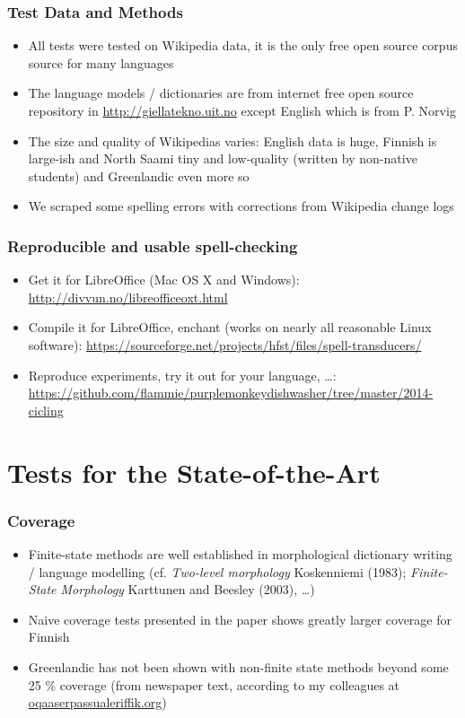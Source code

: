 \documentclass[t,12pt]{beamer}
\begin{document}
\begin{frame}
    \frametitle{Test Data and Methods}
    \begin{itemize}
        \item All tests were tested on Wikipedia data, it is the only free
            open source corpus source for many languages
        \item The language models / dictionaries are from internet free open
            source repository in \url{http://giellatekno.uit.no} except English
            which is from P. Norvig
        \item The size and quality of Wikipedias varies: English data is
            huge, Finnish is large-ish and North Saami tiny and low-quality
            (written by non-native students) and Greenlandic even more so

        \item We scraped some spelling errors with corrections from
            Wikipedia change logs
    \end{itemize}
\end{frame}

\begin{frame}[label=links]
    \frametitle{Reproducible and usable spell-checking}
    \begin{itemize}
        \item Get it for LibreOffice (Mac OS X and Windows):
            \url{http://divvun.no/libreofficeoxt.html}
        \item Compile it for LibreOffice, enchant (works on nearly all
            reasonable Linux software):
            \url{https://sourceforge.net/projects/hfst/files/spell-transducers/}
        \item Reproduce experiments, try it out for your language, \ldots:
            \url{https://github.com/flammie/purplemonkeydishwasher/tree/master/2014-cicling}
    \end{itemize}
\end{frame}

\section{Tests for the State-of-the-Art}

\begin{frame}
    \frametitle{Coverage}
    \begin{itemize}
        \item Finite-state methods are well established in morphological
            dictionary writing / language modelling (cf. \emph{Two-level
            morphology} Koskenniemi (1983); \emph{Finite-State Morphology}
            Karttunen and Beesley (2003), \ldots)
        \item Naive coverage tests presented in the paper shows greatly
            larger coverage for Finnish
        \item Greenlandic has not been shown with non-finite state methods
            beyond some 25 \% coverage (from newspaper text,
            according to my colleagues at
            \url{oqaaserpassualeriffik.org})
    \end{itemize}
\end{frame}
\end{document}
